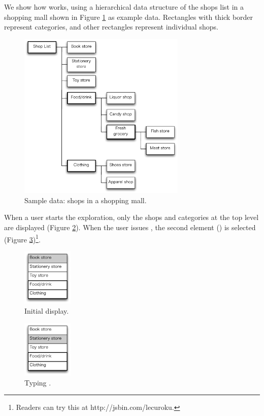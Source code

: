 \documentclass{article}
\begin{document}
We show how {\ST} works, using a hierarchical data structure of
the shops list in a shopping mall shown in Figure \ref{fig1} as example data.
Rectangles with thick border represent categories, and
other rectangles represent individual shops.

\begin{figure}[H]
\centerline{\includegraphics[width=80mm,bb=0 0 490 490]{figures/fig1.pdf}}
\caption{Sample data: shops in a shopping mall.}
\label{fig1}
\end{figure}

When a user starts the exploration, only the shops and categories
at the top level are displayed (Figure \ref{fig2}).
When the user issues {\D},
the second element () is selected (Figure \ref{fig3})\footnote{
  Readers can try this at \textsf{http://jsbin.com/lecuroku}.
}.

\begin{figure}[H]
\centerline{\includegraphics[width=24mm,bb=0 0 139 157]{figures/fig2.pdf}}
\caption{Initial display.}
\label{fig2}
\end{figure}

\begin{figure}[H]
\centerline{\includegraphics[width=24mm,bb=0 0 139 157]{figures/fig3.pdf}}
\caption{Typing {\D}.}
\label{fig3}
\end{figure}
\end{document}

